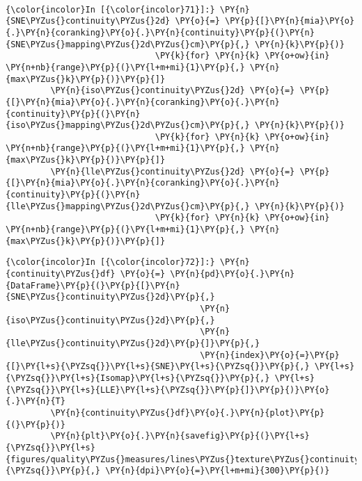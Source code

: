     \begin{center}
    \end{center}
    { \hspace*{\fill} \\}

    \begin{Verbatim}[commandchars=\\\{\}]
{\color{incolor}In [{\color{incolor}71}]:} \PY{n}{SNE\PYZus{}continuity\PYZus{}2d} \PY{o}{=} \PY{p}{[}\PY{n}{mia}\PY{o}{.}\PY{n}{coranking}\PY{o}{.}\PY{n}{continuity}\PY{p}{(}\PY{n}{SNE\PYZus{}mapping\PYZus{}2d\PYZus{}cm}\PY{p}{,} \PY{n}{k}\PY{p}{)}
                              \PY{k}{for} \PY{n}{k} \PY{o+ow}{in} \PY{n+nb}{range}\PY{p}{(}\PY{l+m+mi}{1}\PY{p}{,} \PY{n}{max\PYZus{}k}\PY{p}{)}\PY{p}{]}
         \PY{n}{iso\PYZus{}continuity\PYZus{}2d} \PY{o}{=} \PY{p}{[}\PY{n}{mia}\PY{o}{.}\PY{n}{coranking}\PY{o}{.}\PY{n}{continuity}\PY{p}{(}\PY{n}{iso\PYZus{}mapping\PYZus{}2d\PYZus{}cm}\PY{p}{,} \PY{n}{k}\PY{p}{)}
                              \PY{k}{for} \PY{n}{k} \PY{o+ow}{in} \PY{n+nb}{range}\PY{p}{(}\PY{l+m+mi}{1}\PY{p}{,} \PY{n}{max\PYZus{}k}\PY{p}{)}\PY{p}{]}
         \PY{n}{lle\PYZus{}continuity\PYZus{}2d} \PY{o}{=} \PY{p}{[}\PY{n}{mia}\PY{o}{.}\PY{n}{coranking}\PY{o}{.}\PY{n}{continuity}\PY{p}{(}\PY{n}{lle\PYZus{}mapping\PYZus{}2d\PYZus{}cm}\PY{p}{,} \PY{n}{k}\PY{p}{)}
                              \PY{k}{for} \PY{n}{k} \PY{o+ow}{in} \PY{n+nb}{range}\PY{p}{(}\PY{l+m+mi}{1}\PY{p}{,} \PY{n}{max\PYZus{}k}\PY{p}{)}\PY{p}{]}
\end{Verbatim}

    \begin{Verbatim}[commandchars=\\\{\}]
{\color{incolor}In [{\color{incolor}72}]:} \PY{n}{continuity\PYZus{}df} \PY{o}{=} \PY{n}{pd}\PY{o}{.}\PY{n}{DataFrame}\PY{p}{(}\PY{p}{[}\PY{n}{SNE\PYZus{}continuity\PYZus{}2d}\PY{p}{,}
                                       \PY{n}{iso\PYZus{}continuity\PYZus{}2d}\PY{p}{,}
                                       \PY{n}{lle\PYZus{}continuity\PYZus{}2d}\PY{p}{]}\PY{p}{,}
                                       \PY{n}{index}\PY{o}{=}\PY{p}{[}\PY{l+s}{\PYZsq{}}\PY{l+s}{SNE}\PY{l+s}{\PYZsq{}}\PY{p}{,} \PY{l+s}{\PYZsq{}}\PY{l+s}{Isomap}\PY{l+s}{\PYZsq{}}\PY{p}{,} \PY{l+s}{\PYZsq{}}\PY{l+s}{LLE}\PY{l+s}{\PYZsq{}}\PY{p}{]}\PY{p}{)}\PY{o}{.}\PY{n}{T}
         \PY{n}{continuity\PYZus{}df}\PY{o}{.}\PY{n}{plot}\PY{p}{(}\PY{p}{)}
         \PY{n}{plt}\PY{o}{.}\PY{n}{savefig}\PY{p}{(}\PY{l+s}{\PYZsq{}}\PY{l+s}{figures/quality\PYZus{}measures/lines\PYZus{}texture\PYZus{}continuity\PYZus{}2d.png}\PY{l+s}{\PYZsq{}}\PY{p}{,} \PY{n}{dpi}\PY{o}{=}\PY{l+m+mi}{300}\PY{p}{)}
\end{Verbatim}

